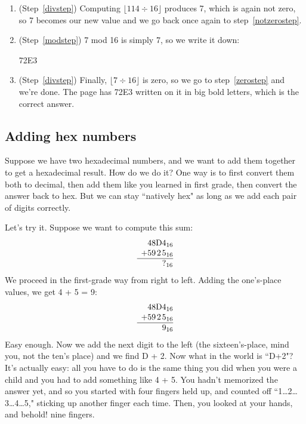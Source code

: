 \begin{enumerate}
\item (Step~\ref{divstep}) Computing $\lfloor 114 \div 16 \rfloor$ produces
7, which is again not zero, so 7 becomes our new value and we go back once
again to step~\ref{notzerostep}.

\item (Step~\ref{modstep}) 7 mod 16 is simply 7, so we write it down:

{\Large
\begin{center}
72E3
\end{center}
}

\item (Step~\ref{divstep}) Finally, $\lfloor 7 \div 16 \rfloor$ is zero, so
we go to step~\ref{zerostep} and we're done. The page has 72E3 written on
it in big bold letters, which is the correct answer.
\end{enumerate}

\subsection{Adding hex numbers}

Suppose we have two hexadecimal numbers, and we want to add them together
to get a hexadecimal result. How do we do it? One way is to first convert
them both to decimal, then add them like you learned in first grade, then
convert the answer back to hex. But we can stay ``natively hex" as long as
we add each pair of digits correctly.

Let's try it. Suppose we want to compute this sum:
\[
\begin{array}{*{5}{c@{\hspace{0pt}}}}
   &        4 &        8 & \text{D} & 4_{16} \\
 + &        5 &        9 &        2 & 5_{16} \\
\hline
   &          &          &          & ?_{16} \\
\end{array}
\]
We proceed in the first-grade way from right to left. Adding the
one's-place values, we get 4 + 5 = 9:
\[
\begin{array}{*{5}{c@{\hspace{0pt}}}}
   &        4 &        8 & \text{D} & 4_{16} \\
 + &        5 &        9 &        2 & 5_{16} \\
\hline
   &          &          &          & 9_{16} \\
\end{array}
\]
Easy enough. Now we add the next digit to the left (the sixteen's-place,
mind you, not the ten's place) and we find D + 2. Now what in the world is
``D+2"? It's actually easy: all you have to do is the same thing you did
when you were a child and you had to add something like 4 + 5. You hadn't
memorized the answer yet, and so you started with four fingers held up, and
counted off ``1\dots 2\dots 3\dots 4\dots 5," sticking up another finger
each time. Then, you looked at your hands, and behold! nine fingers.

